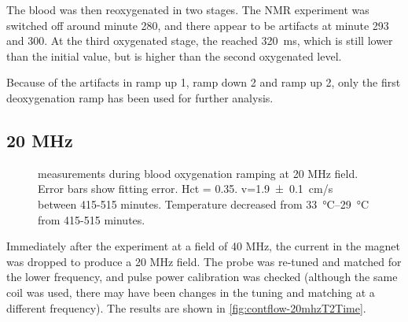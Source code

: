 The blood was then reoxygenated in two stages.
The NMR experiment was switched off around minute 280, and there appear to be artifacts at minute 293 and 300.
At the third oxygenated stage, the \Ttwo reached \SI{320}{ms}, which is still lower than the initial value, but is higher than the second oxygenated level.

Because of the artifacts in ramp up 1, ramp down 2 and ramp up 2, only the first deoxygenation ramp has been used for further analysis.

\subsection{20 MHz}
\begin{figure}[t]
\centering
{}
\caption[\Ttwo measurements during blood oxygenation ramping at 20 MHz field]{\Ttwo measurements during blood oxygenation ramping at 20 MHz field. Error bars show \Ttwo fitting error. Hct = 0.35. v=\SI{1.9\pm0.1}{cm/s} between  415-515 minutes. Temperature decreased from \SIrange{33}{29}{\celsius} from 415-515 minutes.}
\label{fig:contflow-20mhzT2Time}
\end{figure}

Immediately after the experiment at a field of 40 MHz, the current in the magnet was dropped to produce a 20 MHz field.
The probe was re-tuned and matched for the lower frequency, and pulse power calibration was checked (although the same coil was used, there may have been changes in the tuning and matching at a different frequency).
The results are shown in \autoref{fig:contflow-20mhzT2Time}.

